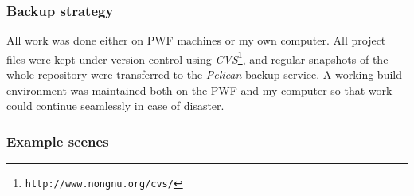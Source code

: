 \subsubsection{Backup strategy}
All work was done either on PWF machines or my own computer. All project files were kept under
version control using \textsl{CVS}\footnote{\texttt{http://www.nongnu.org/cvs/}}, and regular
snapshots of the whole repository were transferred to the \textsl{Pelican} backup service.
A working build environment was maintained both on the PWF and my computer so that work could
continue seamlessly in case of disaster.

\subsubsection{Example scenes}
\begin{figure}
\centerline{
    \hspace{1.3cm}
}
\end{figure}
